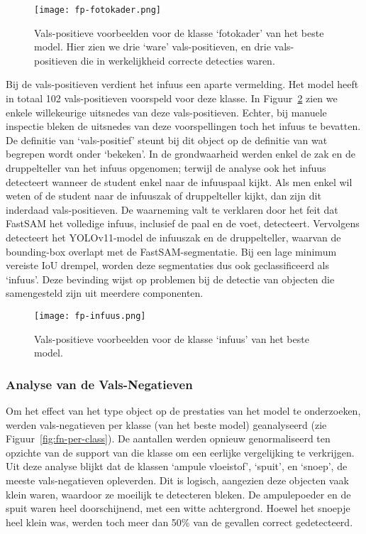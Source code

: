 \begin{figure}[H]
  \centering
  \texttt{[image: fp-fotokader.png]}
  \caption[]{\label{fig:fp-examples-fotokader}
    Vals-positieve voorbeelden voor de klasse `fotokader' van het beste model.
    Hier zien we drie `ware' vals-positieven, en drie vals-positieven die in werkelijkheid correcte detecties waren. 
    }
\end{figure}

Bij de vals-positieven verdient het infuus een aparte vermelding.
Het model heeft in totaal 102 vals-positieven voorspeld voor deze klasse.
In Figuur~\ref{fig:fp-infuus} zien we enkele willekeurige uitsnedes van deze vals-positieven.
Echter, bij manuele inspectie bleken de uitsnedes van deze voorspellingen toch het infuus te bevatten.
De definitie van `vals-positief' steunt bij dit object op de definitie van wat begrepen wordt onder `bekeken'.
In de grondwaarheid werden enkel de zak en de druppelteller van het infuus opgenomen;
terwijl de analyse ook het infuus detecteert wanneer de student enkel naar de infuuspaal kijkt.
Als men enkel wil weten of de student naar de infuuszak of druppelteller kijkt, dan zijn dit inderdaad vals-positieven.
De waarneming valt te verklaren door het feit dat FastSAM het volledige infuus, inclusief de paal en de voet, detecteert.
Vervolgens detecteert het YOLOv11-model de infuuszak en de druppelteller, waarvan de bounding-box overlapt met de FastSAM-segmentatie.
Bij een lage minimum vereiste IoU drempel, worden deze segmentaties dus ook geclassificeerd als `infuus'.
Deze bevinding wijst op problemen bij de detectie van objecten die samengesteld zijn uit meerdere componenten.

\begin{figure}[H]
  \centering
  \texttt{[image: fp-infuus.png]}
  \caption[]{\label{fig:fp-infuus}
    Vals-positieve voorbeelden voor de klasse `infuus' van het beste model.
    }
\end{figure}

\subsubsection{Analyse van de Vals-Negatieven}

Om het effect van het type object op de prestaties van het model te onderzoeken,
werden vals-negatieven per klasse (van het beste model) geanalyseerd (zie Figuur~\ref{fig:fn-per-class}).
De aantallen werden opnieuw genormaliseerd ten opzichte van de support van die klasse om een eerlijke vergelijking te verkrijgen.
Uit deze analyse blijkt dat de klassen `ampule vloeistof', `spuit', en `snoep', de meeste vals-negatieven opleverden.
Dit is logisch, aangezien deze objecten vaak klein waren, waardoor ze moeilijk te detecteren bleken.
De ampulepoeder en de spuit waren heel doorschijnend, met een witte achtergrond.
Hoewel het snoepje heel klein was, werden toch meer dan 50\% van de gevallen correct gedetecteerd. 

